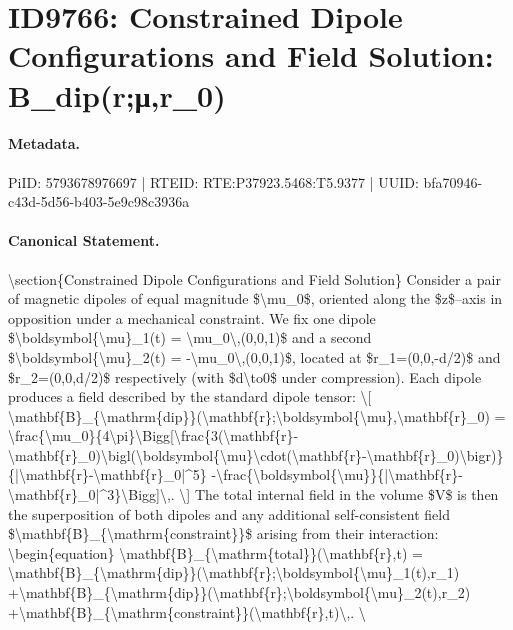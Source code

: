 \section*{ID9766: Constrained Dipole Configurations and Field Solution: B\_dip(r;μ,r\_0)}
\paragraph{Metadata.}
PiID: 5793678976697 | RTEID: RTE:P37923.5468:T5.9377 | UUID: bfa70946-c43d-5d56-b403-5e9c98c3936a

\paragraph{Canonical Statement.}
\textbackslash{}section\{Constrained Dipole Configurations and Field Solution\} Consider a pair of magnetic dipoles of equal magnitude \$\textbackslash{}mu\_0\$, oriented along the \$z\$--axis in opposition under a mechanical constraint. We fix one dipole \$\textbackslash{}boldsymbol\{\textbackslash{}mu\}\_1(t) = \textbackslash{}mu\_0\textbackslash{},(0,0,1)\$ and a second \$\textbackslash{}boldsymbol\{\textbackslash{}mu\}\_2(t) = -\textbackslash{}mu\_0\textbackslash{},(0,0,1)\$, located at \$r\_1=(0,0,-d/2)\$ and \$r\_2=(0,0,d/2)\$ respectively (with \$d\textbackslash{}to0\$ under compression). Each dipole produces a field described by the standard dipole tensor: \textbackslash{}[ \textbackslash{}mathbf\{B\}\_\{\textbackslash{}mathrm\{dip\}\}(\textbackslash{}mathbf\{r\};\textbackslash{}boldsymbol\{\textbackslash{}mu\},\textbackslash{}mathbf\{r\}\_0) = \textbackslash{}frac\{\textbackslash{}mu\_0\}\{4\textbackslash{}pi\}\textbackslash{}Bigg[\textbackslash{}frac\{3(\textbackslash{}mathbf\{r\}-\textbackslash{}mathbf\{r\}\_0)\textbackslash{}bigl(\textbackslash{}boldsymbol\{\textbackslash{}mu\}\textbackslash{}cdot(\textbackslash{}mathbf\{r\}-\textbackslash{}mathbf\{r\}\_0)\textbackslash{}bigr)\}\{|\textbackslash{}mathbf\{r\}-\textbackslash{}mathbf\{r\}\_0|\textasciicircum{}5\} -\textbackslash{}frac\{\textbackslash{}boldsymbol\{\textbackslash{}mu\}\}\{|\textbackslash{}mathbf\{r\}-\textbackslash{}mathbf\{r\}\_0|\textasciicircum{}3\}\textbackslash{}Bigg]\textbackslash{},. \textbackslash{}] The total internal field in the volume \$V\$ is then the superposition of both dipoles and any additional self-consistent field \$\textbackslash{}mathbf\{B\}\_\{\textbackslash{}mathrm\{constraint\}\}\$ arising from their interaction: \textbackslash{}begin\{equation\} \textbackslash{}mathbf\{B\}\_\{\textbackslash{}mathrm\{total\}\}(\textbackslash{}mathbf\{r\},t) = \textbackslash{}mathbf\{B\}\_\{\textbackslash{}mathrm\{dip\}\}(\textbackslash{}mathbf\{r\};\textbackslash{}boldsymbol\{\textbackslash{}mu\}\_1(t),r\_1) +\textbackslash{}mathbf\{B\}\_\{\textbackslash{}mathrm\{dip\}\}(\textbackslash{}mathbf\{r\};\textbackslash{}boldsymbol\{\textbackslash{}mu\}\_2(t),r\_2) +\textbackslash{}mathbf\{B\}\_\{\textbackslash{}mathrm\{constraint\}\}(\textbackslash{}mathbf\{r\},t)\textbackslash{},. \textbackslash{}


